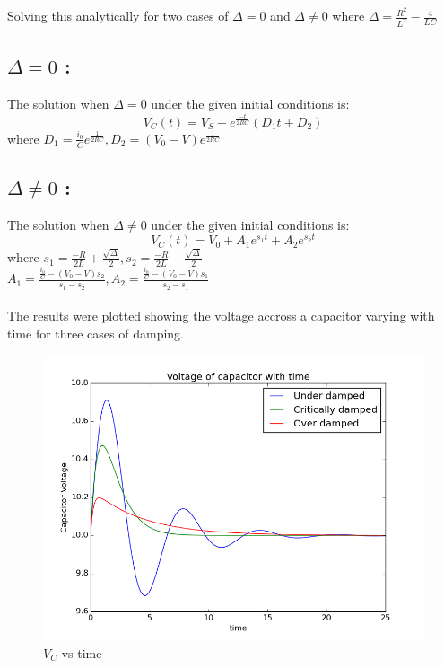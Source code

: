 \documentclass[12pt, a4paper]{report}
\begin{document}
Solving this analytically for two cases of $\Delta = 0$ and $\Delta \ne 0$ where $\Delta = \frac{R^2}{L^2} - \frac{4}{LC}$ \\
\subsection*{$\Delta = 0$ :}
The solution when $\Delta = 0$ under the given initial conditions is:
\begin{equation}
 V_C(t) = V_S + e^\frac{-t}{2RC}(D_1t + D_2)
\end{equation}
where $D_1 = \frac{i_0}{C}e^\frac{1}{2RC} , D_2 = (V_0 - V)e^\frac{1}{2RC}$
\subsection*{$\Delta \ne 0$ :}
The solution when $\Delta \ne 0$ under the given initial conditions is:
\begin{equation}
 V_C(t) = V_0 + A_1e^{s_1t} + A_2e^{s_2t}
\end{equation}
where $s_1 = \frac{-R}{2L} + \frac{\sqrt{\Delta}}{2} , s_2 = \frac{-R}{2L} - \frac{\sqrt{\Delta}}{2}$ \\
$A_1 = \frac{\frac{i_0}{C} - (V_0 - V)s_2}{s_1 - s_2} , A_2 = \frac{\frac{i_0}{C} - (V_0 - V)s_1}{s_2 - s_1}$ \\
\\

The results were plotted showing the voltage accross a capacitor varying with time for three cases of damping.
\begin{figure}[H]
 \centering
 \includegraphics[width = \textwidth]{VC.png}
 \caption{$V_C$ vs time}
 \label{VC}
\end{figure}
\end{document}
